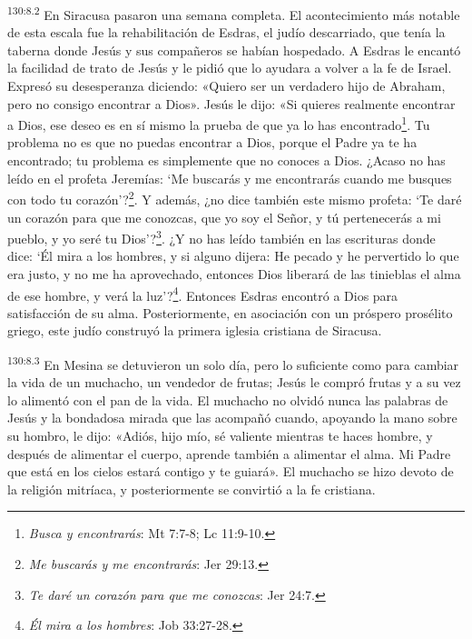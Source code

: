 \par 
\textsuperscript{130:8.2} En Siracusa pasaron una semana completa. El acontecimiento más notable de esta escala fue la rehabilitación de Esdras, el judío descarriado, que tenía la taberna donde Jesús y sus compañeros se habían hospedado. A Esdras le encantó la facilidad de trato de Jesús y le pidió que lo ayudara a volver a la fe de Israel. Expresó su desesperanza diciendo: «Quiero ser un verdadero hijo de Abraham, pero no consigo encontrar a Dios». Jesús le dijo: «Si quieres realmente encontrar a Dios, ese deseo es en sí mismo la prueba de que ya lo has encontrado\footnote{\textit{Busca y encontrarás}: Mt 7:7-8; Lc 11:9-10.}. Tu problema no es que no puedas encontrar a Dios, porque el Padre ya te ha encontrado; tu problema es simplemente que no conoces a Dios. ¿Acaso no has leído en el profeta Jeremías: `Me buscarás y me encontrarás cuando me busques con todo tu corazón'?\footnote{\textit{Me buscarás y me encontrarás}: Jer 29:13.}. Y además, ¿no dice también este mismo profeta: `Te daré un corazón para que me conozcas, que yo soy el Señor, y tú pertenecerás a mi pueblo, y yo seré tu Dios'?\footnote{\textit{Te daré un corazón para que me conozcas}: Jer 24:7.}. ¿Y no has leído también en las escrituras donde dice: `Él mira a los hombres, y si alguno dijera: He pecado y he pervertido lo que era justo, y no me ha aprovechado, entonces Dios liberará de las tinieblas el alma de ese hombre, y verá la luz'?\footnote{\textit{Él mira a los hombres}: Job 33:27-28.}. Entonces Esdras encontró a Dios para satisfacción de su alma. Posteriormente, en asociación con un próspero prosélito griego, este judío construyó la primera iglesia cristiana de Siracusa.

\par 
\textsuperscript{130:8.3} En Mesina se detuvieron un solo día, pero lo suficiente como para cambiar la vida de un muchacho, un vendedor de frutas; Jesús le compró frutas y a su vez lo alimentó con el pan de la vida. El muchacho no olvidó nunca las palabras de Jesús y la bondadosa mirada que las acompañó cuando, apoyando la mano sobre su hombro, le dijo: «Adiós, hijo mío, sé valiente mientras te haces hombre, y después de alimentar el cuerpo, aprende también a alimentar el alma. Mi Padre que está en los cielos estará contigo y te guiará». El muchacho se hizo devoto de la religión mitríaca, y posteriormente se convirtió a la fe cristiana.


